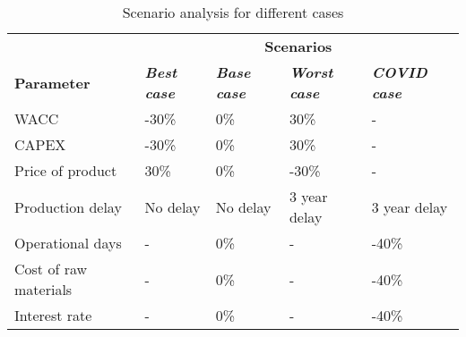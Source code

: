 
\begin{wraptable}{r}{18cm}
\caption{Scenario analysis for different cases}
\label{scenario_analysis}
\begin{tabular}{l|llll}
\hline
\rowcolor[HTML]{D2F3FA} 
                      & \multicolumn{4}{c}{\cellcolor[HTML]{D2F3FA}\textbf{Scenarios}}                                                          \\
\rowcolor[HTML]{D2F3FA} 
\textbf{Parameter}    & \textit{\textbf{Best case}} & \textit{\textbf{Base case}} & \textit{\textbf{Worst case}} & \textit{\textbf{COVID case}} \\
WACC                  & -30\%                       & 0\%                         & 30\%                         & -                            \\
CAPEX                 & -30\%                       & 0\%                         & 30\%                         & -                            \\
Price of product      & 30\%                        & 0\%                         & -30\%                        & -                            \\
Production delay      & No delay                    & No delay                    & 3 year delay                 & 3 year delay                 \\
Operational days      & -                           & 0\%                         & -                            & -40\%                        \\
Cost of raw materials & -                           & 0\%                         & -                            & -40\%                        \\
Interest rate         & -                           & 0\%                         & -                            & -40\%                        \\ \hline
\end{tabular}
\end{wraptable}

